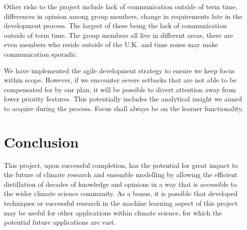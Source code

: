 \documentclass{ecmm427_assignment}
\begin{document}
 Other risks to the project include lack of communication outside of term time, differences in opinion among group members, change in requirements late in the development process. The largest of these being the lack of communication outside of term time. The group members all live in different areas, there are even members who reside outside of the U.K. and time zones may make communication sporadic. 

We have implemented the agile development strategy to ensure we keep focus within scope. However, if we encounter severe setbacks that are not able to be compensated for by our plan, it will be possible to divert attention away from lower priority features. This potentially includes the analytical insight we aimed to acquire during the process. Focus shall always be on the learner functionality.
 
 \section{Conclusion}
 
 This project, upon successful completion, has the potential for great impact to the future of climate research and ensemble modelling by allowing the efficient distillation of decades of knowledge and opinions in a way that is accessible to the wider climate science community. As a bonus, it is possible that developed techniques or successful research in the machine learning aspect of this project may be useful for other applications within climate science, for which the potential future applications are vast.


\end{document}
